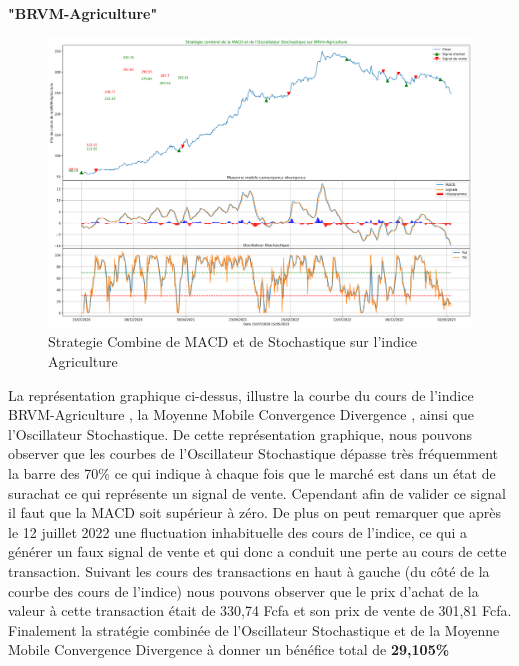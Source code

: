 \begin{itemize}
  \textbf{"BRVM-Agriculture"}

  \begin{figure}
  \hypertarget{fig:Strategieux20Combineux20deux20MACDux20etux20deux20Stochastiqueux20surux20lux27indiceux20Agriculture}{%
  \centering
  \includegraphics{img/MACD-Agri.png}
  \caption{Strategie Combine de MACD et de Stochastique sur l'indice
  Agriculture}\label{fig:Strategieux20Combineux20deux20MACDux20etux20deux20Stochastiqueux20surux20lux27indiceux20Agriculture}
  }
  \end{figure}

  {La représentation graphique ci-dessus, illustre la courbe du cours de
  l'indice BRVM-Agriculture , la Moyenne Mobile Convergence Divergence ,
  ainsi que l'Oscillateur Stochastique. De cette représentation
  graphique, nous pouvons observer que les courbes de l'Oscillateur
  Stochastique dépasse très fréquemment la barre des 70\% ce qui indique
  à chaque fois que le marché est dans un état de surachat ce qui
  représente un signal de vente. Cependant afin de valider ce signal il
  faut que la MACD soit supérieur à zéro. De plus on peut remarquer que
  après le 12 juillet 2022 une fluctuation inhabituelle des cours de
  l'indice, ce qui a générer un faux signal de vente et qui donc a
  conduit une perte au cours de cette transaction. Suivant les cours des
  transactions en haut à gauche (du côté de la courbe des cours de
  l'indice) nous pouvons observer que le prix d'achat de la valeur à
  cette transaction était de 330,74 Fcfa et son prix de vente de 301,81
  Fcfa. Finalement la stratégie combinée de l'Oscillateur Stochastique
  et de la Moyenne Mobile Convergence Divergence à donner un bénéfice
  total de \textbf{29,105\%} }


\end{itemize}
